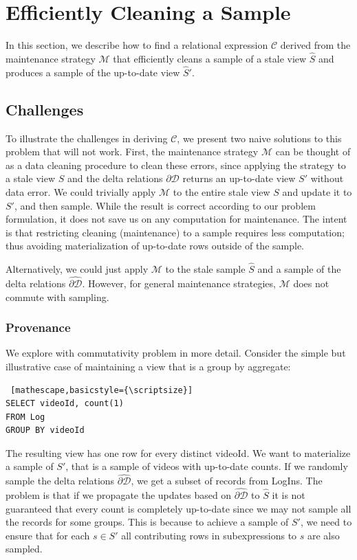 \section{Efficiently Cleaning a Sample} \label{sampling}
In this section, we describe how to find a relational expression $\mathcal{C}$ derived from the maintenance strategy $\mathcal{M}$ that
efficiently cleans a sample of a stale view $\widehat{S}$ and produces a sample of the up-to-date view $\widehat{S}'$.

\subsection{Challenges}
To illustrate the challenges in deriving $\mathcal{C}$, we present two naive solutions to this problem that will not work.
First, the maintenance strategy $\mathcal{M}$ can be thought of as a data cleaning procedure to clean these errors, since applying the strategy to a stale view $S$ and the delta relations $\partial \mathcal{D}$ returns an up-to-date view $S'$ without data error.
We could trivially apply $\mathcal{M}$ to the entire stale view $S$ and update it to $S'$, and then sample.
While the result is correct according to our problem formulation, it does not save us on any computation for maintenance.
The intent is that restricting cleaning (maintenance) to a sample requires less computation; thus avoiding materialization of up-to-date rows outside of the sample.

Alternatively, we could just apply $\mathcal{M}$ to the stale sample $\widehat{S}$ and a sample of the delta relations $\widehat{\partial \mathcal{D}}$. 
However, for general maintenance strategies, $\mathcal{M}$ does not commute with sampling.

\subsubsection{Provenance}
\label{lin}
We explore with commutativity problem in more detail.
Consider the simple but illustrative case of maintaining a view that is a group by aggregate:
\begin{lstlisting} [mathescape,basicstyle={\scriptsize}]
SELECT videoId, count(1) 
FROM Log
GROUP BY videoId
\end{lstlisting}
The resulting view has one row for every distinct videoId.
We want to materialize a sample of $S'$, that is a sample of videos with up-to-date counts.
If we randomly sample the delta relations $\widehat{\partial \mathcal{D}}$, we get a subset of records from LogIns.
The problem is that if we propagate the updates based on $\widehat{\partial \mathcal{D}}$ to $\widehat{S}$ it is not guaranteed that 
every count is completely up-to-date since we may not sample all the records for some groups.
This is because to achieve a sample of $S'$, we need to ensure that for each $s \in S'$ all contributing rows in subexpressions to $s$ are also sampled. 

